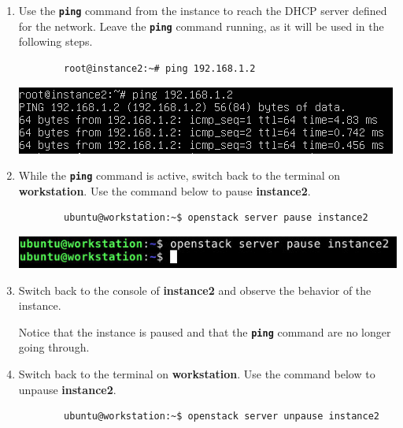 \documentclass[letterpaper, 12pt]{article}
\begin{document}
\begin{enumerate}
    \item Use the \textbf{\texttt{ping}} command from the instance to reach the DHCP server defined for the network.
    Leave the \textbf{\texttt{ping}} command running, as it will be used in the following steps.
    \begin{lstlisting}
        root@instance2:~# ping 192.168.1.2
    \end{lstlisting}

    \begin{center}
        \includegraphics[width=\linewidth]{images/part5/step10.png}
    \end{center}

    \item While the \textbf{\texttt{ping}} command is active, switch back to the terminal on \textbf{workstation}. Use
    the command below to pause \textbf{instance2}.
    \begin{lstlisting}
        ubuntu@workstation:~$ openstack server pause instance2
    \end{lstlisting}

    \begin{center}
        \includegraphics[width=\linewidth]{images/part5/step11.png}
    \end{center}

    \item Switch back to the console of \textbf{instance2} and observe the behavior of the instance.

    \begin{notebox}
        Notice that the instance is paused and that the \textbf{\texttt{ping}} command are no longer going through.
    \end{notebox}

    \item Switch back to the terminal on \textbf{workstation}. Use the command below to unpause \textbf{instance2}.
    \begin{lstlisting}
        ubuntu@workstation:~$ openstack server unpause instance2
    \end{lstlisting}


\end{enumerate}
\end{document}
